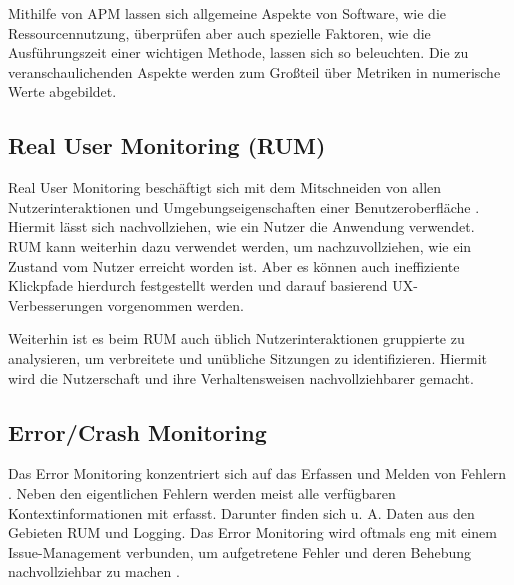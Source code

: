 Mithilfe von APM lassen sich allgemeine Aspekte von Software, wie die Ressourcennutzung, überprüfen aber auch spezielle Faktoren, wie die Ausführungszeit einer wichtigen Methode, lassen sich so beleuchten. Die zu veranschaulichenden Aspekte werden zum Großteil über Metriken in numerische Werte abgebildet.

\subsection{Real User Monitoring (RUM)}


Real User Monitoring beschäftigt sich mit dem Mitschneiden von allen Nutzerinteraktionen und Umgebungseigenschaften einer Benutzeroberfläche \cite{IdentifyingWebPerformanceDegradations}. Hiermit lässt sich nachvollziehen, wie ein Nutzer die Anwendung verwendet. RUM kann weiterhin dazu verwendet werden, um nachzuvollziehen, wie ein Zustand vom Nutzer erreicht worden ist. Aber es können auch ineffiziente Klickpfade hierdurch festgestellt werden und darauf basierend UX-Verbesserungen vorgenommen werden.

Weiterhin ist es beim RUM auch üblich Nutzerinteraktionen gruppierte zu analysieren, um verbreitete und unübliche Sitzungen zu identifizieren. Hiermit wird die Nutzerschaft und ihre Verhaltensweisen nachvollziehbarer gemacht.

%

\subsection{Error/Crash Monitoring}

Das Error Monitoring konzentriert sich auf das Erfassen und Melden von Fehlern \cite{CrashbinCrashMonitoring}. Neben den eigentlichen Fehlern werden meist alle verfügbaren Kontextinformationen mit erfasst. Darunter finden sich u. A. Daten aus den Gebieten RUM und Logging. Das Error Monitoring wird oftmals eng mit einem Issue-Management verbunden, um aufgetretene Fehler und deren Behebung nachvollziehbar zu machen \cite{CrashbinCrashMonitoring}.

